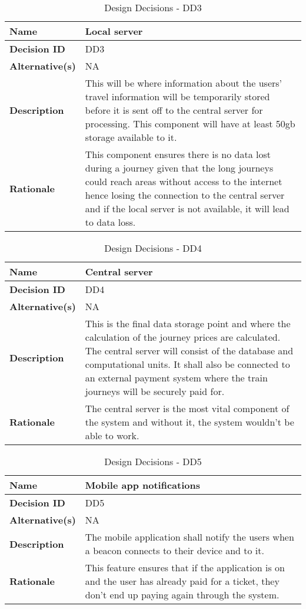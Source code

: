 \begin{table}[H]
	\centering
	\begin{tabularx}{\linewidth}{l|X}
		\textbf{Name}      & Local server\\ \hline
		\textbf{Decision ID}  & DD3 \\ \hline
		\textbf{Alternative(s)}     & NA \\ \hline
		\textbf{Description}   & This will be where information about the users' travel information will be temporarily stored before it is sent off to the central server for processing. This component will have at least 50gb storage available to it.\\ \hline
		\textbf{Rationale}    & This component ensures there is no data lost during a journey given that the long journeys could reach areas without access to the internet hence losing the connection to the central server and if the local server is not available, it will lead to data loss. \\ \hline
	\end{tabularx}
	\caption{Design Decisions - DD3}
	\label{tbl:uc1}
\end{table}

\begin{table}[H]
	\centering
	\begin{tabularx}{\linewidth}{l|X}
		\textbf{Name}      & Central server \\ \hline
		\textbf{Decision ID}  & DD4 \\ \hline
		\textbf{Alternative(s)}     & NA  \\ \hline
		\textbf{Description}   & This is the final data storage point and where the calculation of the journey prices are calculated. The central server will consist of the database and computational units. It shall also be connected to an external payment system where the train journeys will be securely paid for. \\ \hline
		\textbf{Rationale}    & The central server is the most vital component of the system and without it, the system wouldn't be able to work.  \\ \hline
	\end{tabularx}
	\caption{Design Decisions - DD4}
	\label{tbl:uc1}
\end{table}

\begin{table}[H]
	\centering
	\begin{tabularx}{\linewidth}{l|X}
		\textbf{Name}      & Mobile app notifications \\ \hline
		\textbf{Decision ID}  & DD5 \\ \hline
		\textbf{Alternative(s)}     & NA  \\ \hline
		\textbf{Description}   & The mobile application shall notify the users when a beacon connects to their device and to it.\\ \hline
		\textbf{Rationale}    & This feature ensures that if the application is on and the user has already paid for a ticket, they don't end up paying again through the system. \\ \hline
	\end{tabularx}
	\caption{Design Decisions - DD5}
	\label{tbl:uc1}
\end{table}

